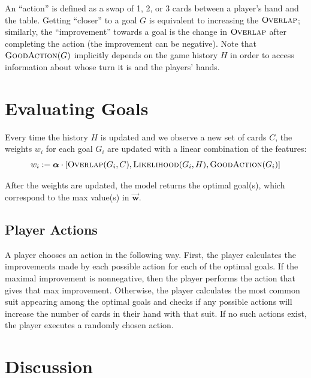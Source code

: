 \documentclass[11pt]{article}
\newcommand{\bvec}[1]{\vec{\mathbf{#1}}}
\newcommand{\overlap}{\textsc{Overlap}}
\newcommand{\lkhd}{\textsc{Likelihood}}
\newcommand{\goodaction}{\textsc{GoodAction}}
\begin{document}
An ``action'' is defined as a swap of 1, 2, or 3 cards between a player's hand and the table. Getting ``closer'' to a goal $G$ is equivalent to increasing the $\overlap$; similarly, the ``improvement'' towards a goal is the change in $\overlap$ after completing the action (the improvement can be negative). Note that $\goodaction(G)$ implicitly depends on the game history $H$ in order to access information about whose turn it is and the players' hands.

\section{Evaluating Goals}

Every time the history $H$ is updated and we observe a new set of cards $C$, the weights $w_i$ for each goal $G_i$ are updated with a linear combination of the features:
\begin{equation}
  w_i := \bm{\alpha} \cdot [\overlap(G_i,C), \lkhd(G_i,H), \goodaction(G_i)]
\label{eq:w-update} \end{equation}

After the weights are updated, the model returns the optimal goal(s), which correspond to the max value(s) in $\bvec{w}$.

\subsection{Player Actions}

A player chooses an action in the following way. First, the player calculates the improvements made by each possible action for each of the optimal goals. If the maximal improvement is nonnegative, then the player performs the action that gives that max improvement. Otherwise, the player calculates the most common suit appearing among the optimal goals and checks if any possible actions will increase the number of cards in their hand with that suit. If no such actions exist, the player executes a randomly chosen action.


\section{Discussion}
\end{document}
